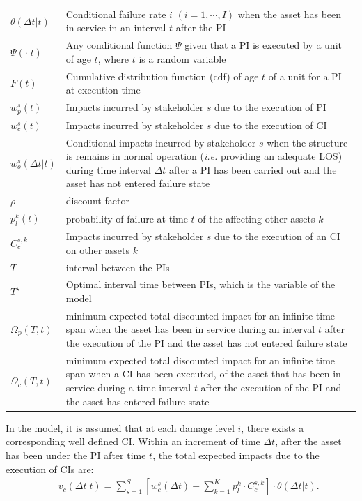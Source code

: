 \begin{tabular}{lp{12.5cm}}
	$\theta(\Delta t|t)$ & Conditional failure rate $i$ $(i=1,\cdots,I)$ when the asset has been in service in an interval $t$ after the PI \\ 
	$\Psi(\cdot|t)$ & Any conditional function $\Psi$ given that a PI is executed by a unit of age $t$, where $t$ is a random variable \\ 
	$F(t)$ & Cumulative distribution function (cdf) of age $t$ of a unit for a PI at execution time\\ 
	$w_{p}^s(t)$ & Impacts incurred by stakeholder $s$ due to the execution of PI\\ 
	$w_{c}^s(t)$ & Impacts incurred by stakeholder $s$ due to the execution of CI \\ 
	$w_o^s(\Delta t|t)$ & Conditional impacts incurred by stakeholder $s$ when the structure is remains in normal operation (\emph{i.e.} providing an adequate LOS) during time interval $\Delta t$ after a PI has been carried out and the asset has not entered failure state\\ 
	$\rho$ & discount factor\\
	$p_l^k (t)$ & probability of failure at time $t$ of the affecting other assets $k$ \\
	$C_c^{s,k}$ & Impacts incurred by stakeholder $s$ due to the execution of an CI on other assets $k$ \\
	$T$ & interval between the PIs\\ 
	$T^{\star}$ & Optimal interval time between PIs, which is the variable of the model\\
	$\Omega_{p}(T,t)$ & minimum expected total discounted impact for an infinite time span when the asset has been in service during an interval $t$ after the execution of the PI and the asset has not entered failure state\\
	$\Omega_{c}(T,t)$ & minimum expected total discounted impact for an infinite time span when a CI has been executed, of the asset that has been in service during a time interval $t$ after the execution of the PI and the asset has entered failure state\\
\end{tabular}
In the model, it is assumed that at each damage level $i$, there exists a corresponding well defined CI. Within an increment of time $\Delta t$, after the asset has been under the PI after time $t$, the total expected impacts due to the execution of CIs are:
\begin{eqnarray}
&& v_c (\Delta t|t) =\sum_{s=1}^{S} \left [ w_{c}^s  (\Delta t) + \sum_{k=1}^K p_l^k \cdot C_c^{s,k} \right ] \cdot \theta (\Delta t|t) .\label{totalCIs}
\end{eqnarray}
